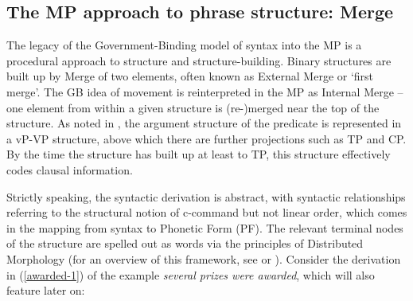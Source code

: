 \documentclass[output=paper,hidelinks]{langscibook}
\begin{document}
\subsection{The MP approach to phrase structure: Merge}
\label{sec:minimalism:merge}

The legacy of the Government-Binding model of syntax into the MP is a
procedural approach to structure and structure-building. Binary
structures are built up by Merge of two elements, often known as
External Merge or `first merge'. The GB idea of movement is
reinterpreted in the MP as Internal Merge -- one element from within a
given structure is (re-)merged near the top of the structure. As noted
in , the argument structure of the
predicate is represented in a vP-VP structure, above which there are
further projections such as TP and CP. By the time the structure has
built up at least to TP, this structure effectively codes clausal
information.

Strictly speaking, the syntactic derivation is abstract, with
syntactic relationships referring to the structural notion of
c-command but not linear order, which comes in the mapping from syntax
to Phonetic Form (PF). The relevant terminal nodes of the structure
are spelled out as words via the principles of Distributed Morphology
(for an overview of this framework, see \citealp{harleynoyer03} or
\citealp{embicknoyer07}). Consider the derivation in (\ref{awarded-1}) of the
example {\it several prizes were awarded\/}, which will also feature
later on:

\ea\label{awarded-1}
\z
\end{document}
